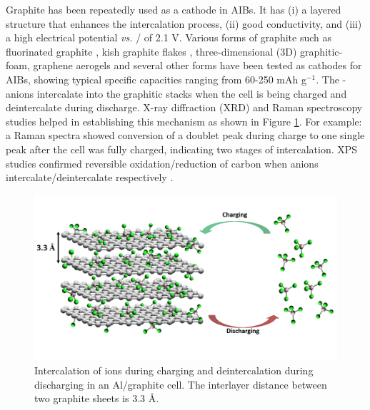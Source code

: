 \documentclass{article}
\begin{document}
Graphite has been repeatedly used as a cathode in AIBs. It has (i) a layered structure that enhances the intercalation process, (ii) good conductivity, and (iii) a high electrical potential {\it vs.} / of 2.1 V. Various forms of graphite such as fluorinated graphite \cite{rani_fluorinated_2013}, kish graphite flakes \cite{wang_kish_2017}, three-dimensional (3D) graphitic-foam\cite{wu_3d_2016}, graphene aerogels\cite{huang_graphene_2019} and several other forms have been tested as cathodes for AIBs, showing typical specific capacities ranging from 60-250 mAh g$^{-1}$. The -anions intercalate into the graphitic stacks when the cell is being charged and deintercalate during discharge. X-ray diffraction (XRD) and Raman spectroscopy studies helped in establishing this mechanism \cite{rani_fluorinated_2013, wang_advanced_2017,lin_ultrafast_2015-3} as shown in Figure \ref{fig:graphitemech}. For example: a Raman spectra showed conversion of a doublet peak during charge to one single peak after the cell was fully charged, indicating two stages of intercalation. XPS studies confirmed reversible oxidation/reduction of carbon when  anions intercalate/deintercalate respectively \cite{stadie_zeolite-templated_2017, liu_binder-free_2019,wei_amorphous_2017}.

\begin{figure}[h!]
  \centering
  \includegraphics[width=\textwidth]{fig/graphitemech}
    \caption{Intercalation of  ions during charging and deintercalation during discharging in an Al/graphite cell. The interlayer distance between two graphite sheets is 3.3 \AA.}
  \label{fig:graphitemech}
\end{figure}
\end{document}
